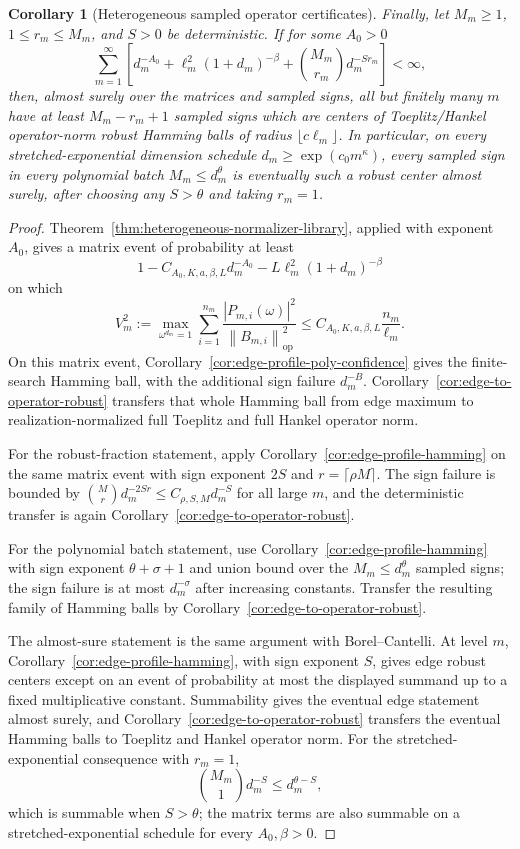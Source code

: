 \documentclass[11pt]{amsart}
\numberwithin{equation}{section}
\newtheorem{corollary}[theorem]{Corollary}
\theoremstyle{definition}
\theoremstyle{remark}
\newcommand{\op}{\mathrm{op}}
\newcommand{\norm}[1]{\left\lVert #1\right\rVert}
\newcommand{\abs}[1]{\left\lvert #1\right\rvert}
\begin{document}
\begin{corollary}[Heterogeneous sampled operator certificates]
Finally, let \(M_m\ge1\), \(1\le r_m\le M_m\), and \(S>0\) be deterministic.  If
for some \(A_0>0\)
\[
  \sum_{m=1}^{\infty}
  \left[
    d_m^{-A_0}+\ell_m^2(1+d_m)^{-\beta}
    +\binom{M_m}{r_m}d_m^{-S r_m}
  \right]<\infty,
\]
then, almost surely over the matrices and sampled signs, all but finitely many
\(m\) have at least \(M_m-r_m+1\) sampled signs which are centers of
Toeplitz/Hankel operator-norm robust Hamming balls of radius
\(\lfloor c\ell_m\rfloor\).  In particular, on every stretched-exponential
dimension schedule \(d_m\ge\exp(c_0m^\kappa)\), every sampled sign in every
polynomial batch \(M_m\le d_m^\theta\) is eventually such a robust center almost
surely, after choosing any \(S>\theta\) and taking \(r_m=1\).
\end{corollary}

\begin{proof}
Theorem~\ref{thm:heterogeneous-normalizer-library}, applied with exponent
\(A_0\), gives a matrix event of probability at least
\[
  1-C_{A_0,K,a,\beta,L}d_m^{-A_0}
    -L\ell_m^2(1+d_m)^{-\beta}
\]
on which
\[
  V_m^2:=
  \max_{\omega^{d_m}=1}
  \sum_{i=1}^{n_m}
  \frac{\abs{P_{m,i}(\omega)}^2}{\norm{B_{m,i}}_{\op}^2}
  \le C_{A_0,K,a,\beta,L}\frac{n_m}{\ell_m}.
\]
On this matrix event, Corollary~\ref{cor:edge-profile-poly-confidence} gives
the finite-search Hamming ball, with the additional sign failure \(d_m^{-B}\).
Corollary~\ref{cor:edge-to-operator-robust} transfers that whole Hamming ball
from edge maximum to realization-normalized full Toeplitz and full Hankel
operator norm.

For the robust-fraction statement, apply
Corollary~\ref{cor:edge-profile-hamming} on the same matrix event with sign
exponent \(2S\) and \(r=\lceil\rho M\rceil\).  The sign failure is bounded by
\(\binom{M}{r}d_m^{-2Sr}\le C_{\rho,S,M}d_m^{-S}\) for all large \(m\), and
the deterministic transfer is again Corollary~\ref{cor:edge-to-operator-robust}.

For the polynomial batch statement, use
Corollary~\ref{cor:edge-profile-hamming} with sign exponent
\(\theta+\sigma+1\) and union bound over the \(M_m\le d_m^\theta\) sampled
signs; the sign failure is at most \(d_m^{-\sigma}\) after increasing constants.
Transfer the resulting family of Hamming balls by
Corollary~\ref{cor:edge-to-operator-robust}.

The almost-sure statement is the same argument with Borel--Cantelli.  At level
\(m\), Corollary~\ref{cor:edge-profile-hamming}, with sign exponent \(S\), gives
edge robust centers except on an event of probability at most the displayed
summand up to a fixed multiplicative constant.  Summability gives the eventual
edge statement almost surely, and Corollary~\ref{cor:edge-to-operator-robust}
transfers the eventual Hamming balls to Toeplitz and Hankel operator norm.  For
the stretched-exponential consequence with \(r_m=1\),
\[
  \binom{M_m}{1}d_m^{-S}\le d_m^{\theta-S},
\]
which is summable when \(S>\theta\); the matrix terms are also summable on a
stretched-exponential schedule for every \(A_0,\beta>0\).
\end{proof}
\end{document}
